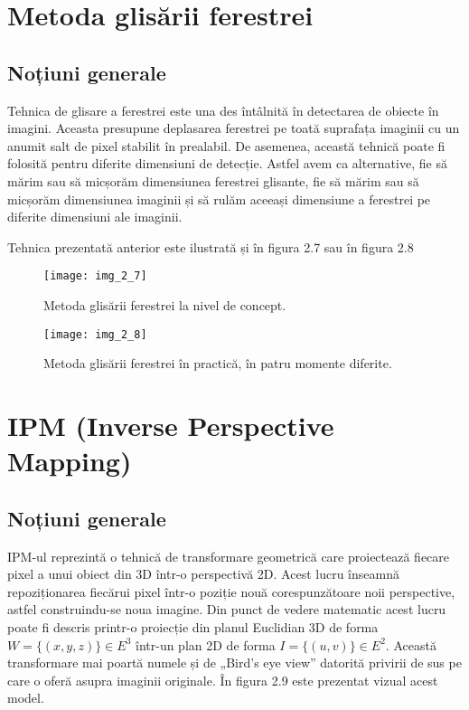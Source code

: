\section{Metoda glisării ferestrei}

\subsection{Noțiuni generale}

Tehnica de glisare a ferestrei este una des întâlnită în detectarea de obiecte în imagini. Aceasta presupune deplasarea ferestrei pe toată suprafața imaginii cu un anumit salt de pixel stabilit în prealabil. De asemenea, această tehnică poate fi folosită pentru diferite dimensiuni de detecție. Astfel avem ca alternative, fie să mărim sau să micșorăm dimensiunea ferestrei glisante, fie să mărim sau să micșorăm dimensiunea imaginii și să rulăm aceeași dimensiune a ferestrei pe diferite dimensiuni ale imaginii.

Tehnica prezentată anterior este ilustrată și în figura 2.7 sau în figura 2.8
\begin{figure}[!h]
	\centering
	\texttt{[image: img\_2\_7]}
	\caption{Metoda glisării ferestrei la nivel de concept.}
	\label{fig:nonfloat}
\end{figure}
\begin{figure}[!h]
	\centering
	\texttt{[image: img\_2\_8]}
	\caption{Metoda glisării ferestrei în practică, în patru momente diferite.}
	\label{fig:nonfloat}
\end{figure}

\section{IPM (Inverse Perspective Mapping)}

\subsection{Noțiuni generale}

IPM-ul reprezintă o tehnică de transformare geometrică care proiectează fiecare pixel a unui obiect din 3D într-o perspectivă 2D. Acest lucru înseamnă repoziționarea fiecărui pixel într-o poziție nouă corespunzătoare noii perspective, astfel construindu-se noua imagine. Din punct de vedere matematic acest lucru poate fi descris printr-o proiecție din planul Euclidian 3D de forma $W = \{(x,y,z)\} \in E^3$ într-un plan 2D de forma $I = \{(u,v)\} \in E^2$. Această transformare mai poartă numele și de „Bird's eye view” datorită privirii de sus pe care o oferă asupra imaginii originale. În figura 2.9 este prezentat vizual acest model.

